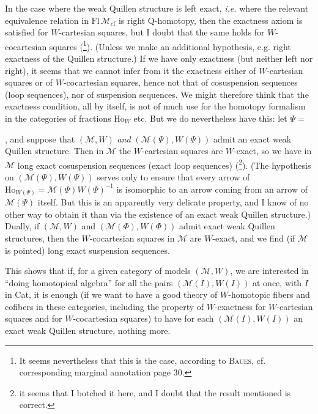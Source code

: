 \documentclass[11pt]{article}
\newcommand{\printedpage}[1]{\marginpar{\footnotesize p.~#1}}
\newcommand{\msp}[1]{\marginpar{\footnotesize [#1]}}
\newcommand{\cM}{\mathcal{M}}
\begin{document}
In the case where the weak Quillen structure is left exact, \textit{i.e.} where the relevant equivalence relation in $\mathrm{Fl}\,\cM_{\mathrm{cf}}$ is right Q-homotopy, then the exactness axiom is satisfied for $W$-cartesian squares, but I doubt that the same holds for $W$-cocartesian squares (\footnote{It seems nevertheless that this is the case, according to \textsc{Baues}, cf. corresponding marginal annotation page 30.}). (Unless we make an additional hypothesis, e.g. right exactness of the Quillen structure.) If we have only exactness (but neither left nor right), it seems that we cannot infer from it the exactness either of $W$-cartesian squares or of $W$-cocartesian squares, hence not that of cosuspension sequences (loop sequences), nor of suspension sequences. We might therefore think that the exactness condition, all by itself, is not of much
\msp{page 33}
use for the homotopy formalism in the categories of fractions $\mathrm{Ho}_W$ etc. But we do nevertheless have this: let $\Psi = {}$, and suppose that $(\cM,W)$ \textit{and} $(\cM(\Psi),W(\Psi))$ 
\printedpage{20}
 admit an exact weak Quillen structure. Then in $\cM$ the $W$-cartesian squares are $W$-exact, so we have in $\cM$ long exact cosuspension sequences (exact loop sequences) (\footnote{it seems that I botched it here, and I doubt that the result mentioned is correct.}). (The hypothesis on $(\cM(\Psi),W(\Psi))$ serves only to ensure that every arrow of $\mathrm{Ho}_{W(\Psi)} = \cM(\Psi)W(\Psi)^{-1}$ is isomorphic to an arrow coming from an arrow of $\cM(\Psi)$ itself. But this is an apparently very delicate property, and I know of no other way to obtain it than via the existence of an exact weak Quillen structure.) Dually, if $(\cM,W)$ and $(\cM(\Phi),W(\Phi))$ admit exact weak Quillen structures, then the $W$-cocartesian squares in $\cM$ are $W$-exact, and we find (if $\cM$ is pointed) long exact suspension sequences. %

\msp{page 34}
This shows that if, for a given category of models $(\cM,W)$, we are interested in ``doing homotopical algebra'' for all the pairs $(\cM(I),W(I))$ at once, with $I$ in Cat, it is enough (if we want to have a good theory of $W$-homotopic fibers and cofibers in these categories, including the property of $W$-exactness for $W$-cartesian squares and for $W$-cocartesian squares) to have for each $(\cM(I),W(I))$ an exact weak Quillen structure, nothing more.
\end{document}
